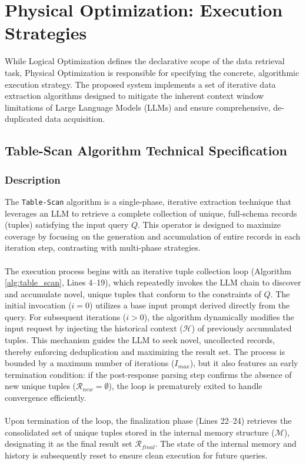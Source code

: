 \section{Physical Optimization: Execution Strategies}

While Logical Optimization defines the declarative scope of the data retrieval task, Physical Optimization is responsible for specifying the concrete, algorithmic execution strategy. The proposed system implements a set of iterative data extraction algorithms designed to mitigate the inherent context window limitations of Large Language Models (LLMs) and ensure comprehensive, de-duplicated data acquisition.

\subsection{Table-Scan Algorithm Technical Specification}

\subsubsection{Description}
The \texttt{Table-Scan} algorithm is a single-phase, iterative extraction technique that leverages an LLM to retrieve a complete collection of unique, full-schema records (tuples) satisfying the input query $Q$. This operator is designed to maximize coverage by focusing on the generation and accumulation of entire records in each iteration step, contrasting with multi-phase strategies.
\\\\
The execution process begins with an iterative tuple collection loop (Algorithm \ref{alg:table_scan}, Lines 4--19), which repeatedly invokes the LLM chain to discover and accumulate novel, unique tuples that conform to the constraints of $Q$. The initial invocation ($i=0$) utilizes a base input prompt derived directly from the query. For subsequent iterations ($i > 0$), the algorithm dynamically modifies the input request by injecting the historical context ($\mathcal{H}$) of previously accumulated tuples. This mechanism guides the LLM to seek novel, uncollected records, thereby enforcing deduplication and maximizing the result set. The process is bounded by a maximum number of iterations ($I_{max}$), but it also features an early termination condition: if the post-response parsing step confirms the absence of new unique tuples ($\mathcal{R}_{new} = \emptyset$), the loop is prematurely exited to handle convergence efficiently.
\\\\
Upon termination of the loop, the finalization phase (Lines 22--24) retrieves the consolidated set of unique tuples stored in the internal memory structure ($\mathcal{M}$), designating it as the final result set $\mathcal{R}_{final}$. The state of the internal memory and history is subsequently reset to ensure clean execution for future queries.

